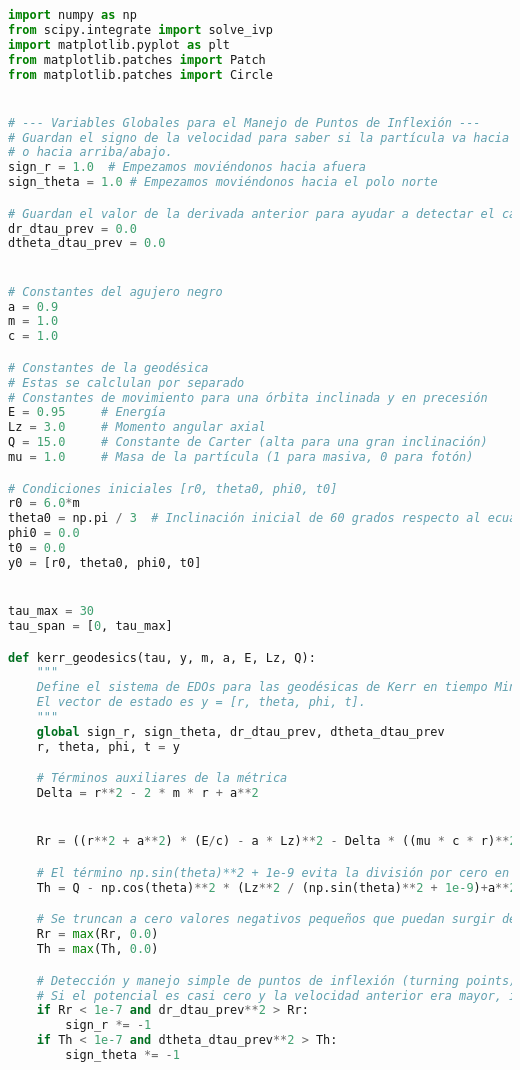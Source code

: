 \begin{lstlisting}[language=Python, caption=Programa para el calculo de las geodesicas en Kerr]
    import numpy as np
from scipy.integrate import solve_ivp
import matplotlib.pyplot as plt
from matplotlib.patches import Patch
from matplotlib.patches import Circle


# --- Variables Globales para el Manejo de Puntos de Inflexión ---
# Guardan el signo de la velocidad para saber si la partícula va hacia adentro/afuera
# o hacia arriba/abajo.
sign_r = 1.0  # Empezamos moviéndonos hacia afuera
sign_theta = 1.0 # Empezamos moviéndonos hacia el polo norte

# Guardan el valor de la derivada anterior para ayudar a detectar el cambio de signo.
dr_dtau_prev = 0.0
dtheta_dtau_prev = 0.0


# Constantes del agujero negro
a = 0.9
m = 1.0
c = 1.0

# Constantes de la geodésica
# Estas se calclulan por separado
# Constantes de movimiento para una órbita inclinada y en precesión
E = 0.95     # Energía 
Lz = 3.0     # Momento angular axial
Q = 15.0     # Constante de Carter (alta para una gran inclinación)
mu = 1.0     # Masa de la partícula (1 para masiva, 0 para fotón)

# Condiciones iniciales [r0, theta0, phi0, t0]
r0 = 6.0*m
theta0 = np.pi / 3  # Inclinación inicial de 60 grados respecto al ecuador
phi0 = 0.0
t0 = 0.0
y0 = [r0, theta0, phi0, t0]


tau_max = 30
tau_span = [0, tau_max]

def kerr_geodesics(tau, y, m, a, E, Lz, Q):
    """
    Define el sistema de EDOs para las geodésicas de Kerr en tiempo Mino (tau).
    El vector de estado es y = [r, theta, phi, t].
    """
    global sign_r, sign_theta, dr_dtau_prev, dtheta_dtau_prev
    r, theta, phi, t = y

    # Términos auxiliares de la métrica
    Delta = r**2 - 2 * m * r + a**2


    Rr = ((r**2 + a**2) * (E/c) - a * Lz)**2 - Delta * ((mu * c * r)**2 + (Lz - a * (E/c))**2 + Q)

    # El término np.sin(theta)**2 + 1e-9 evita la división por cero en los polos.
    Th = Q - np.cos(theta)**2 * (Lz**2 / (np.sin(theta)**2 + 1e-9)+a**2 * ((mu* c)**2 - (E/c)**2))

    # Se truncan a cero valores negativos pequeños que puedan surgir de errores de precisión.
    Rr = max(Rr, 0.0)
    Th = max(Th, 0.0)

    # Detección y manejo simple de puntos de inflexión (turning points)
    # Si el potencial es casi cero y la velocidad anterior era mayor, invertimos la dirección.
    if Rr < 1e-7 and dr_dtau_prev**2 > Rr:
        sign_r *= -1
    if Th < 1e-7 and dtheta_dtau_prev**2 > Th:
        sign_theta *= -1


\end{lstlisting}
